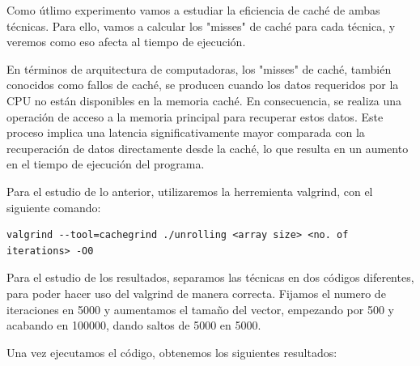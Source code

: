 \documentclass[a4paper,twocolumn]{article}
\begin{document}
Como útlimo experimento vamos a estudiar la eficiencia de caché de ambas técnicas. Para ello, vamos a calcular los "misses" de caché para cada técnica, y veremos como eso afecta al tiempo de ejecución.

En términos de arquitectura de computadoras, los "misses" de caché, también conocidos como fallos de caché, se producen cuando los datos requeridos por la CPU no están disponibles en la memoria caché. En consecuencia, se realiza una operación de acceso a la memoria principal para recuperar estos datos. Este proceso implica una latencia significativamente mayor comparada con la recuperación de datos directamente desde la caché, lo que resulta en un aumento en el tiempo de ejecución del programa.

Para el estudio de lo anterior, utilizaremos la herremienta valgrind, con el siguiente comando:

\begin{lstlisting}[caption={Comando para ejecutar valgrind},label={lst:codigoC}]
    valgrind --tool=cachegrind ./unrolling <array size> <no. of iterations> -O0
\end{lstlisting}

Para el estudio de los resultados, separamos las técnicas en dos códigos diferentes, para poder hacer uso del valgrind de manera correcta. Fijamos el numero de iteraciones en 5000 y aumentamos el tamaño del vector, empezando por 500 y acabando en 100000, dando saltos de 5000 en 5000. 

Una vez ejecutamos el código, obtenemos los siguientes resultados:
\end{document}
